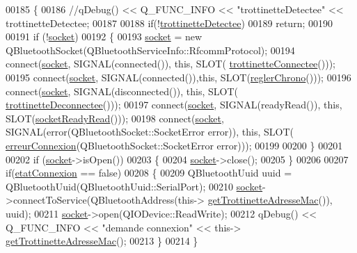 \begin{DoxyCode}
00185 \{
00186     \textcolor{comment}{//qDebug() << Q\_FUNC\_INFO << "trottinetteDetectee" << trottinetteDetectee;}
00187 
00188     \textcolor{keywordflow}{if}(!\hyperlink{class_peripherique_local_af6f664b6af67f1c90eb017391ac812ed}{trottinetteDetectee})
00189         \textcolor{keywordflow}{return};
00190 
00191     \textcolor{keywordflow}{if} (!\hyperlink{class_peripherique_local_a0058bf8367b4b8f907838b83a9150c07}{socket})
00192     \{
00193         \hyperlink{class_peripherique_local_a0058bf8367b4b8f907838b83a9150c07}{socket} = \textcolor{keyword}{new} QBluetoothSocket(QBluetoothServiceInfo::RfcommProtocol);
00194         connect(\hyperlink{class_peripherique_local_a0058bf8367b4b8f907838b83a9150c07}{socket}, SIGNAL(connected()), \textcolor{keyword}{this}, SLOT(
      \hyperlink{class_peripherique_local_ad6e76380e6c9f48c36a10ac4af2c3d96}{trottinetteConnectee}()));
00195         connect(\hyperlink{class_peripherique_local_a0058bf8367b4b8f907838b83a9150c07}{socket}, SIGNAL(connected()),\textcolor{keyword}{this}, SLOT(\hyperlink{class_peripherique_local_ae4f8521445a9dc3a51ff116e1f6597d7}{reglerChrono}()));
00196         connect(\hyperlink{class_peripherique_local_a0058bf8367b4b8f907838b83a9150c07}{socket}, SIGNAL(disconnected()), \textcolor{keyword}{this}, SLOT(
      \hyperlink{class_peripherique_local_ab081485bf0f9403d9e7fc5f0407cdc5c}{trottinetteDeconnectee}()));
00197         connect(\hyperlink{class_peripherique_local_a0058bf8367b4b8f907838b83a9150c07}{socket}, SIGNAL(readyRead()), \textcolor{keyword}{this}, SLOT(\hyperlink{class_peripherique_local_a48840475209b5cabcf60e3176de63b92}{socketReadyRead}()));
00198         connect(\hyperlink{class_peripherique_local_a0058bf8367b4b8f907838b83a9150c07}{socket}, SIGNAL(error(QBluetoothSocket::SocketError error)), \textcolor{keyword}{this}, SLOT(
      \hyperlink{class_peripherique_local_abb86db4a2a3d72a5de32253aa9af1ce8}{erreurConnexion}(QBluetoothSocket::SocketError error)));
00199 
00200     \}
00201 
00202     \textcolor{keywordflow}{if} (\hyperlink{class_peripherique_local_a0058bf8367b4b8f907838b83a9150c07}{socket}->isOpen())
00203     \{
00204         \hyperlink{class_peripherique_local_a0058bf8367b4b8f907838b83a9150c07}{socket}->close();
00205     \}
00206 
00207     \textcolor{keywordflow}{if}(\hyperlink{class_peripherique_local_a5359e5a94b32b8a90c06ec999de13d2c}{etatConnexion} == \textcolor{keyword}{false})
00208     \{
00209         QBluetoothUuid uuid = QBluetoothUuid(QBluetoothUuid::SerialPort);
00210         \hyperlink{class_peripherique_local_a0058bf8367b4b8f907838b83a9150c07}{socket}->connectToService(QBluetoothAddress(this->
      \hyperlink{class_peripherique_local_a465658a204541e309f2647d473f658d8}{getTrottinetteAdresseMac}()), uuid);
00211         \hyperlink{class_peripherique_local_a0058bf8367b4b8f907838b83a9150c07}{socket}->open(QIODevice::ReadWrite);
00212         qDebug() << Q\_FUNC\_INFO << \textcolor{stringliteral}{"demande connexion"} << this->
      \hyperlink{class_peripherique_local_a465658a204541e309f2647d473f658d8}{getTrottinetteAdresseMac}();
00213     \}
00214 \}
\end{DoxyCode}
